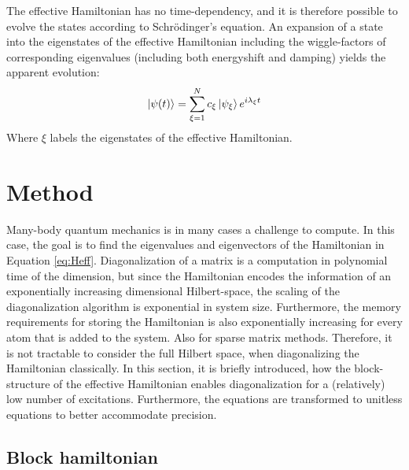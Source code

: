\documentclass{article}
\begin{document}
The effective Hamiltonian has no time-dependency, and it is therefore possible to evolve the states according to Schrödinger's equation. An expansion of a state into the eigenstates of the effective Hamiltonian including the wiggle-factors of corresponding eigenvalues (including both energyshift and damping) yields the apparent evolution:
\begin{equation}
    \begin{split}
        \ket{\psi (t)} = \sum_{\xi=1}^N c_\xi \ket{\psi_\xi} e^{i \lambda_\xi t}
    \end{split}
\end{equation}
Where $\xi$ labels the eigenstates of the effective Hamiltonian. 

\section{Method}

Many-body quantum mechanics is in many cases a challenge to compute. In this case, the goal is to find the eigenvalues and eigenvectors of the Hamiltonian in Equation \ref{eq:Heff}. Diagonalization of a matrix is a computation in polynomial time of the dimension, but since the Hamiltonian encodes the information of an exponentially increasing dimensional Hilbert-space, the scaling of the diagonalization algorithm is exponential in system size. Furthermore, the memory requirements for storing the Hamiltonian is also exponentially increasing for every atom that is added to the system. Also for sparse matrix methods. Therefore, it is not tractable to consider the full Hilbert space, when diagonalizing the Hamiltonian classically. In this section, it is briefly introduced, how the block-structure of the effective Hamiltonian enables diagonalization for a (relatively) low number of excitations. Furthermore, the equations are transformed to unitless equations to better accommodate precision. 

\subsection{Block hamiltonian}\label{sec:block}
\end{document}
